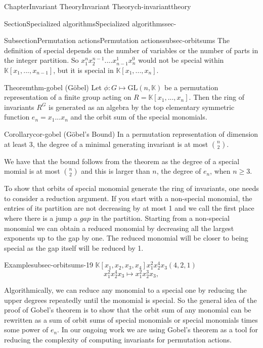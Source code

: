 \documentclass[oneside,10pt,]{book}
\begin{document}
\begin{chapterptx}{Chapter}{Invariant Theory}{}{Invariant Theory}{}{}{ch-invarianttheory}
\begin{sectionptx}{Section}{Specialized algorithms}{}{Specialized algorithms}{}{}{sec-}
\begin{subsectionptx}{Subsection}{Permutation actions}{}{Permutation actions}{}{}{subsec-orbitsums}
The definition of special depends on the number of variables or the number of parts in the integer partition. So \(x_1^n x_2^{n-1}....x_{n-1}^1 x_n^0\) would not be special within \(\mathbb{K}[x_1, ... , x_{n-1}]\), but it is special in \(\mathbb{K}[x_1, ... , x_{n}]\).%
\begin{theorem}{Theorem}{}{}{thm-gobel}%
(Göbel) Let \(\phi:G \mapsto \text{GL}(n,\mathbb{K})\) be a permutation representation of a finite group acting on \(R = \mathbb{K}[x_1,...,x_n]\). Then the ring of invariants \(R^G\) is generated as an algebra by the top elementary symmetric function \(e_n = x_1...x_n\) and the orbit sum of the special monomials.%
\end{theorem}
\begin{corollary}{Corollary}{}{}{cor-gobel}%
(Göbel's Bound) In a permutation representation of dimension at least 3, the degree of a minimal generating invariant is at most \(\binom{n}{2}\).%
\end{corollary}
We have that the bound follows from the theorem as the degree of a special momial is at most \(\binom{n}{2}\) and this is larger than \(n\), the degree of \(e_n\), when \(n \geq 3\).%
\par
To show that orbits of special monomial generate the ring of invariants, one needs to consider a reduction argument. If you start with a non-special monomial, the entries of its partition are not decreasing by at most 1 and we call the first place where there is a jump a \(gap\) in the partition. Starting from a non-special monomial we can obtain a reduced monomial by decreasing all the largest exponents up to the gap by one. The reduced monomial will be closer to being special as the gap itself will be reduced by 1.%
\begin{example}{Example}{}{subsec-orbitsums-19}%
\(\mathbb{K}[x_1,x_2,x_3,x_4]\)\(x_1^2x_2^4x_3 \)\((4,2,1)\)%
\begin{equation*}
x_1^2x_2^4x_3 \mapsto x_1^2x_2^3 x_3,
\end{equation*}
\end{example}
Algorithmically, we can reduce any monomial to a special one by reducing the upper degrees repeatedly until the monomial is special. So the general idea of the proof of Gobel's theorem is to show that the orbit sum of any monomial can be rewritten as a sum of orbit sums of special monomials or special monomials times some power of \(e_n\). In our ongoing work we are using Gobel's theorem as a tool for reducing the complexity of computing invariants for permutation actions.%

\end{subsectionptx}
\end{sectionptx}
\end{chapterptx}
\end{document}
